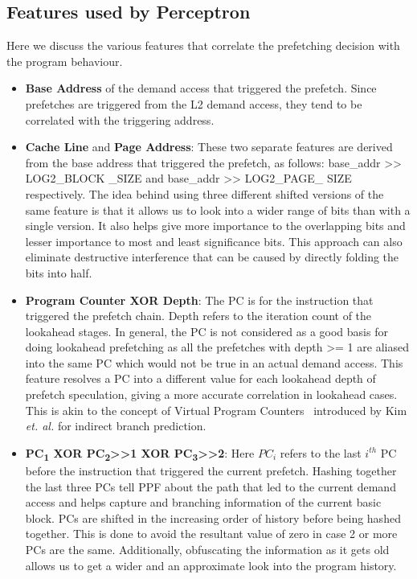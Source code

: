 \subsection{Features used by Perceptron}
\label{Design-Features}
Here we discuss the various features that correlate the prefetching decision
with the program behaviour.

\begin{itemize}
\item \textbf{Base Address} of the demand access that triggered the
  prefetch.  Since prefetches are triggered from the L2 demand access,
  they tend to be correlated with the triggering address.

\item \textbf{Cache Line} and \textbf{Page Address}: These two
  separate features are derived from the base address that triggered
  the prefetch, as follows: base\_addr >> LOG2\_BLOCK \_SIZE and
  base\_addr >> LOG2\_PAGE\_ SIZE respectively.  The idea behind using
  three different shifted versions of the same feature is that it
  allows us to look into a wider range of bits than with a single
  version.  It also helps give more importance to the overlapping bits
  and lesser importance to most and least significance bits.  This
  approach can also eliminate destructive interference that can be
  caused by directly folding the bits into half.


\item \textbf{Program Counter XOR Depth}: The PC is for the instruction
  that triggered the prefetch chain.  Depth refers to the iteration count of
  the lookahead stages.  In general, the PC is not considered as a good basis
  for doing lookahead prefetching as all the prefetches with depth >= 1 are
  aliased into the same PC which would not be true in an actual demand access.
  This feature resolves a PC into a different value for each lookahead depth
  of prefetch speculation, giving a more accurate correlation in lookahead
  cases.  This is akin to the concept of Virtual Program Counters~\cite{VPC}
  introduced by Kim \textit{et. al.} for indirect branch prediction.

\item \textbf{PC\textsubscript{1} XOR PC\textsubscript{2}>>1 XOR
  PC\textsubscript{3}>>2}: Here $PC_i$ refers to the last $i^{th}$
  PC before the instruction that triggered the current prefetch.
  Hashing together the last three PCs tell PPF about the path
  that led to the current demand access and helps capture and
  branching information of the current basic block.  PCs are shifted
  in the increasing order of history before being hashed together.
  This is done to avoid the resultant value of zero in case 2 or more
  PCs are the same.  Additionally, obfuscating the information as it
  gets old allows us to get a wider and an approximate look into the
  program history.


\end{itemize}
